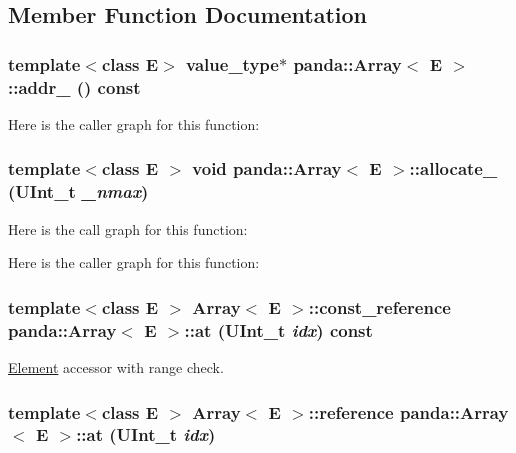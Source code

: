 \subsection{Member Function Documentation}
\hypertarget{classpanda_1_1Array_a7ccf276765e6e092bea87b7181053ac5}{
\subsubsection[{addr\_\-}]{\setlength{\rightskip}{0pt plus 5cm}template$<$class E$>$ {\bf value\_\-type}$\ast$ {\bf panda::Array}$<$ E $>$::addr\_\- () const}}
\label{classpanda_1_1Array_a7ccf276765e6e092bea87b7181053ac5}


Here is the caller graph for this function:\hypertarget{classpanda_1_1Array_ac3bf1d5e18721fed54de1741a71470fc}{
\subsubsection[{allocate\_\-}]{\setlength{\rightskip}{0pt plus 5cm}template$<$class E $>$ void {\bf panda::Array}$<$ E $>$::allocate\_\- (UInt\_\-t {\em \_\-nmax})}}
\label{classpanda_1_1Array_ac3bf1d5e18721fed54de1741a71470fc}


Here is the call graph for this function:

Here is the caller graph for this function:\hypertarget{classpanda_1_1Array_a00c7e7c983451a16d74901000cb1bbe1}{
\subsubsection[{at}]{\setlength{\rightskip}{0pt plus 5cm}template$<$class E $>$ {\bf Array}$<$ E $>$::{\bf const\_\-reference} {\bf panda::Array}$<$ E $>$::at (UInt\_\-t {\em idx}) const}}
\label{classpanda_1_1Array_a00c7e7c983451a16d74901000cb1bbe1}


\hyperlink{classpanda_1_1Element}{Element} accessor with range check. \hypertarget{classpanda_1_1Array_a4f8dde90c3132ac69fe01975137cda25}{
\subsubsection[{at}]{\setlength{\rightskip}{0pt plus 5cm}template$<$class E $>$ {\bf Array}$<$ E $>$::{\bf reference} {\bf panda::Array}$<$ E $>$::at (UInt\_\-t {\em idx})}}
\label{classpanda_1_1Array_a4f8dde90c3132ac69fe01975137cda25}


